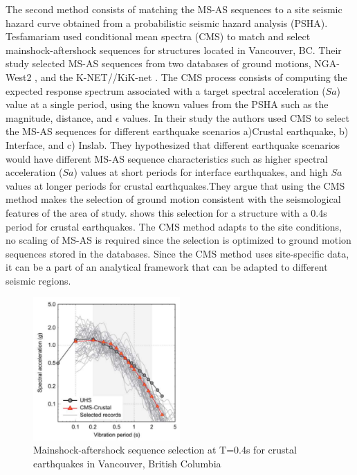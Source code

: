 The second method consists of matching the MS-AS sequences to a site seismic hazard curve obtained from a probabilistic seismic hazard analysis (PSHA). Tesfamariam \cite{Tesfamariam2015} used conditional mean spectra (CMS) to match and select mainshock-aftershock sequences for structures located in Vancouver, BC. Their study selected MS-AS sequences from two databases of ground motions, NGA-West2 \citep{Ancheta2014}, and the K-NET//KiK-net \cite{NIEDK-NETKiK-net2019}. The CMS process consists of computing the expected response spectrum associated with a target spectral acceleration ($Sa$) value at a single period, using the known values from the PSHA such as the magnitude, distance, and $\epsilon$ values. In their study the authors used CMS to select the MS-AS sequences for different earthquake scenarios a)Crustal earthquake, b) Interface, and c) Inslab. They hypothesized that different earthquake scenarios would have different MS-AS sequence characteristics such as higher spectral acceleration ($Sa$) values at short periods for interface earthquakes, and high $Sa$ values at longer periods for crustal earthquakes.They argue that using the CMS method makes the selection of ground motion consistent with the seismological features of the area of study.  shows this selection for a structure with a 0.4s period for crustal earthquakes. The CMS method adapts to the site conditions, no scaling of MS-AS is required since the selection is optimized to ground motion sequences stored in the databases. Since the CMS method uses site-specific data, it can be a part of an analytical framework that can be adapted to different seismic regions.
\begin{figure}[htbp]
\centering
\includegraphics[width=0.5\textwidth]{Chapter-2/figs/CMS-Tesfamariam_MS-AS_seq}
\caption{Mainshock-aftershock sequence selection at T=0.4s for crustal earthquakes in Vancouver, British Columbia \cite{Tesfamariam2015}}
\label{fig:MS-AS_Goda}
\end{figure}

